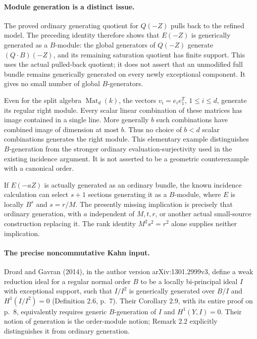 \paragraph{Module generation is a distinct issue.}
The proved ordinary generating quotient for $Q(-Z)$ pulls
back to the refined model. The preceding identity therefore
shows that $E(-Z)$ is generically generated as a $B$-module:
the global generators of $Q(-Z)$ generate $(Q\cdot B)(-Z)$,
and its remaining saturation quotient has finite support.
This uses the actual pulled-back quotient; it does not assert
that an unmodified full bundle remains generically generated
on every newly exceptional component. It gives no small
number of global $B$-generators.

Even for the split algebra $\operatorname{Mat}_d(k)$, the vectors
$v_i=e_i e_1^T$, $1\leq i\leq d$, generate its regular right
module. Every scalar linear combination of these matrices has
image contained in a single line. More generally $b$ such
combinations have combined image of dimension at most $b$.
Thus no choice of $b<d$ scalar combinations generates the right
module. This elementary example distinguishes $B$-generation
from the stronger ordinary evaluation-surjectivity used in the
existing incidence argument. It is not asserted to be a
geometric counterexample with a canonical order.

If $E(-aZ)$ is actually generated as an ordinary bundle, the
known incidence calculation can select $s+1$ sections generating
it as a $B$-module, where $E$ is locally $B^s$ and $s=r/M$.
The presently missing implication is precisely that ordinary
generation, with $a$ independent of $M,t,r$, or another actual
small-source construction replacing it. The rank identity
$M^2s^2=r^2$ alone supplies neither implication.

\paragraph{The precise noncommutative Kahn input.}
Drozd and Gavran (2014), in the author version
arXiv:1301.2999v3, define a weak reduction ideal for a regular
normal order $B$ to be a locally bi-principal ideal $I$ with
exceptional support, such that $I/I^2$ is generically generated
over $B/I$ and $H^1(I/I^2)=0$ (Definition 2.6, p.~7).
Their Corollary 2.9, with its entire proof on p.~8, equivalently
requires generic $B$-generation of $I$ and $H^1(Y,I)=0$.
Their notion of generation is the order-module notion;
Remark 2.2 explicitly distinguishes it from ordinary generation.

